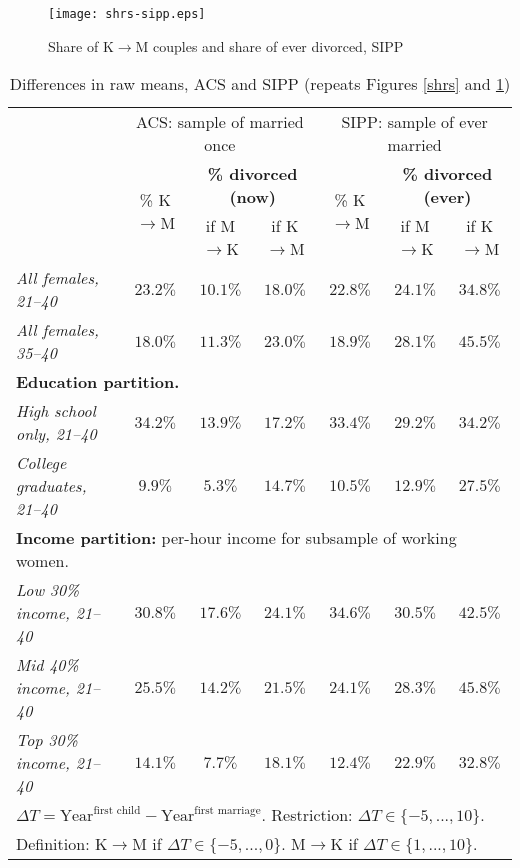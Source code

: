 \documentclass[12pt,letter]{article}
\begin{document}
\begin{figure}[h!]
\centering
\texttt{[image: shrs-sipp.eps]}
\caption{Share of K$\to$M couples and share of ever divorced, SIPP\label{shrs-sipp}}
\end{figure}


\begin{table}[p]
\begin{center}
\begin{tabular}{|l|c||c|c||c||c|c|}\cline{2-7}
\multicolumn{1}{c|}{} & \multicolumn{3}{c||}{\small ACS: sample of married once} & \multicolumn{3}{c|}{\small SIPP: sample of  ever married} \\\cline{2-7}
\multicolumn{1}{c|}{}  & \multirow{2}{*}{\small \% K$\to$M}& \multicolumn{2}{c||}{\textbf{\% divorced (now)}} & \multirow{2}{*}{\footnotesize \% K$\to$M }& \multicolumn{2}{c|}{\textbf{\% divorced (ever)}} \\\cline{3-4}\cline{6-7}
\multicolumn{1}{c|}{}  &  &\small if M$\to$K &  \small if K$\to$M & & \small if M$\to$K & \small if K$\to$M \\\hline
\textit{All females, 21--40}  & $23.2\%$ & $10.1\%$ & $18.0\%$ & $22.8\%$ & $24.1\%$ & $34.8\%$ \\
\textit{All females, 35--40} & $18.0\%$ & $11.3\%$ & $23.0\%$ & $18.9\%$ & $28.1\%$ & $45.5\%$ \\\hline\hline
\multicolumn{7}{|p{0.9\linewidth}|}{\footnotesize \textbf{Education partition.}}\\\hline
\textit{High school only, 21--40} & $34.2\%$ & $13.9\%$ & $17.2\%$ & $33.4\%$ & $29.2\%$  & $34.2\%$ \\
\textit{College graduates, 21--40} & $9.9\%$ & $5.3\%$ & $14.7\%$ & $10.5\%$ & $12.9\%$ & $27.5\%$ \\\hline\hline
\multicolumn{7}{|p{0.9\linewidth}|}{\footnotesize \textbf{Income partition:} per-hour income for subsample of working women.}\\\hline
\textit{Low 30\% income, 21--40} & $30.8\%$ & $17.6\%$ & $24.1\%$ & $34.6\%$ & $30.5\%$ &  $42.5\%$ \\
\textit{Mid 40\% income, 21--40} & $25.5\%$ & $14.2\%$ & $21.5\%$ & $24.1\%$ & $28.3\%$ & $45.8\%$ \\
\textit{Top 30\% income, 21--40} & $14.1\%$ & $7.7\%$ & $18.1\%$ & $12.4\%$ & $22.9\%$  & $32.8\%$ \\\hline
\multicolumn{7}{|p{0.9\linewidth}|}{\footnotesize $\Delta T = \text{Year}^{\text{first child}} - \text{Year}^{\text{first marriage}}$. Restriction: $\Delta T \in \{-5,...,10\}$.}\\
\multicolumn{7}{|p{0.9\linewidth}|}{\footnotesize Definition: K$\to$M if $\Delta T \in \{-5,...,0\}$. M$\to$K if $\Delta T \in \{1,...,10\}$.}\\
\hline
\end{tabular}
\caption{Differences in raw means, ACS and SIPP (repeats Figures \ref{shrs} and \ref{shrs-sipp}) \label{diff-raw}}
\end{center}
\end{table}
\end{document}
